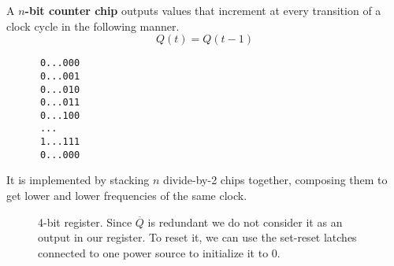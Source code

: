   \begin{definition}
    A \textbf{$n$-bit counter chip} outputs values that increment at every transition of a clock cycle in the following manner. 
    \begin{equation}
      Q(t) = Q(t - 1)
    \end{equation}

    \begin{lstlisting}
      0...000 
      0...001
      0...010 
      0...011 
      0...100 
      ...
      1...111 
      0...000
    \end{lstlisting}

    It is implemented by stacking $n$ divide-by-2 chips together, composing them to get lower and lower frequencies of the same clock. 

    \begin{figure}[H]
      \centering 
      \caption{4-bit register. Since $\overline{Q}$ is redundant we do not consider it as an output in our register. To reset it, we can use the set-reset latches connected to one power source to initialize it to $0$. } 
    \end{figure}
  \end{definition}


